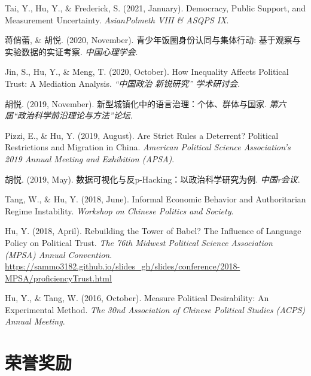 \documentclass[11pt,a4paper,]{awesome-cv}
\begin{document}
\leavevmode{}%
Tai, Y., Hu, Y., \& Frederick, S. (2021, January). Democracy, Public
Support, and Measurement Uncertainty. \emph{AsianPolmeth VIII \& ASQPS
IX}.

\leavevmode{}%
蒋俏蕾, \& 胡悦. (2020, November). 青少年饭圈身份认同与集体行动:
基于观察与实验数据的实证考察. \emph{中国心理学会}.

\leavevmode{}%
Jin, S., Hu, Y., \& Meng, T. (2020, October). How Inequality Affects
Political Trust: A Mediation Analysis. \emph{{``中国政治 新锐研究''}
学术研讨会}.

\leavevmode{}%
胡悦. (2019, November). 新型城镇化中的语言治理：个体、群体与国家.
\emph{第六届``政治科学前沿理论与方法''论坛}.

\leavevmode{}%
Pizzi, E., \& Hu, Y. (2019, August). Are Strict Rules a Deterrent?
Political Restrictions and Migration in China. \emph{American Political
Science Association's 2019 Annual Meeting and Exhibition (APSA)}.

\leavevmode{}%
胡悦. (2019, May). 数据可视化与反p-Hacking：以政治科学研究为例.
\emph{中国r会议}.

\leavevmode{}%
Tang, W., \& Hu, Y. (2018, June). Informal Economic Behavior and
Authoritarian Regime Instability. \emph{Workshop on Chinese Politics and
Society}.

\leavevmode{}%
Hu, Y. (2018, April). Rebuilding the Tower of Babel? The Influence of
Language Policy on Political Trust. \emph{The 76th Midwest Political
Science Association (MPSA) Annual Convention}.
\url{https://sammo3182.github.io/slides_gh/slides/conference/2018-MPSA/proficiencyTrust.html}

\leavevmode{}%
Hu, Y., \& Tang, W. (2016, October). Measure Political Desirability: An
Experimental Method. \emph{The 30nd Association of Chinese Political
Studies (ACPS) Annual Meeting}.

\endgroup

\hypertarget{ux8363ux8a89ux5956ux52b1}{%
\section{荣誉奖励}\label{ux8363ux8a89ux5956ux52b1}}
\end{document}
